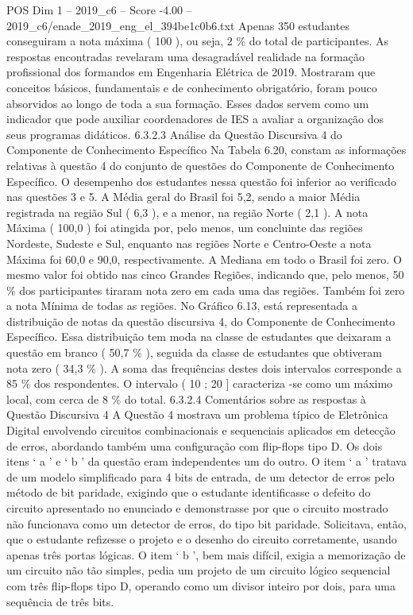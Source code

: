 \begin{textsample}{POS Dim 1 – 2019\_c6 – Score -4.00 – 2019\_c6/enade\_2019\_eng\_el\_394be1c0b6.txt}
Apenas 350 estudantes conseguiram a nota máxima ( 100 ), ou seja, 2 \% do total de participantes.
As respostas encontradas revelaram uma desagradável realidade na formação profissional dos formandos em Engenharia Elétrica de 2019.
Mostraram que conceitos básicos, fundamentais e de conhecimento obrigatório, foram pouco absorvidos ao longo de toda a sua formação.
Esses dados servem como um indicador que pode auxiliar coordenadores de IES a avaliar a organização dos seus programas didáticos. 6.3.2.3 Análise da Questão Discursiva 4 do Componente de Conhecimento Específico Na Tabela 6.20, constam as informações relativas à questão 4 do conjunto de questões do Componente de Conhecimento Específico.
O desempenho dos estudantes nessa questão foi inferior ao verificado nas questões 3 e 5.
A Média geral do Brasil foi 5,2, sendo a maior Média registrada na região Sul ( 6,3 ), e a menor, na região Norte ( 2,1 ).
A nota Máxima ( 100,0 ) foi atingida por, pelo menos, um concluinte das regiões Nordeste, Sudeste e Sul, enquanto nas regiões Norte e Centro-Oeste a nota Máxima foi 60,0 e 90,0, respectivamente.
A Mediana em todo o Brasil foi zero.
O mesmo valor foi obtido nas cinco Grandes Regiões, indicando que, pelo menos, 50 \% dos participantes tiraram nota zero em cada uma das regiões.
Também foi zero a nota Mínima de todas as regiões.
No Gráfico 6.13, está representada a distribuição de notas da questão discursiva 4, do Componente de Conhecimento Específico.
Essa distribuição tem moda na classe de estudantes que deixaram a questão em branco ( 50,7 \% ), seguida da classe de estudantes que obtiveram nota zero ( 34,3 \% ).
A soma das frequências destes dois intervalos corresponde a 85 \% dos respondentes.
O intervalo ( 10 ; 20 ] caracteriza -se como um máximo local, com cerca de 8 \% do total. 6.3.2.4 Comentários sobre as respostas à Questão Discursiva 4 A Questão 4 mostrava um problema típico de Eletrônica Digital envolvendo circuitos combinacionais e sequenciais aplicados em detecção de erros, abordando também uma configuração com flip-flops tipo D.
Os dois itens ‘ a ’ e ‘ b ’ da questão eram independentes um do outro.
O item ‘ a ’ tratava de um modelo simplificado para 4 bits de entrada, de um detector de erros pelo método de bit paridade, exigindo que o estudante identificasse o defeito do circuito apresentado no enunciado e demonstrasse por que o circuito mostrado não funcionava como um detector de erros, do tipo bit paridade.
Solicitava, então, que o estudante refizesse o projeto e o desenho do circuito corretamente, usando apenas três portas lógicas.
O item ‘ b ’, bem mais difícil, exigia a memorização de um circuito não tão simples, pedia um projeto de um circuito lógico sequencial com três flip-flops tipo D, operando como um divisor inteiro por dois, para uma sequência de três bits.

\end{textsample}
